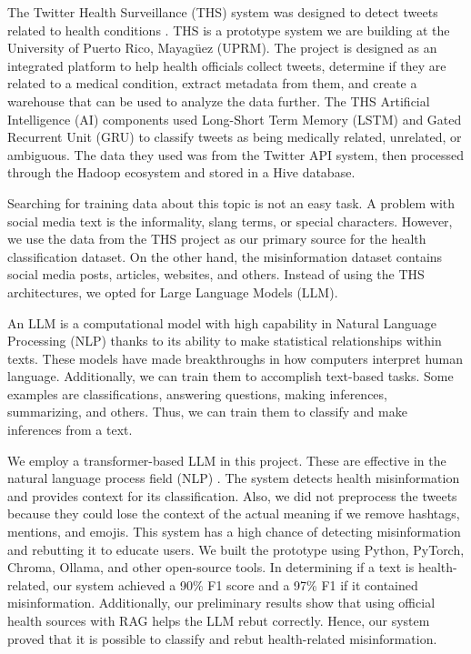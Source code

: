 The Twitter Health Surveillance (THS) system was designed to detect tweets related to health conditions \cite{8622504}. THS is a prototype system we are building at the University
of Puerto Rico, Mayag\"uez (UPRM). The project is designed as an integrated platform to help health officials collect tweets, determine if they are related to a medical condition, extract
metadata from them, and create a warehouse that can be used to analyze the data further. The THS Artificial Intelligence (AI) components used Long-Short Term Memory (LSTM)
and Gated Recurrent Unit (GRU) to classify tweets as being medically related, unrelated, or ambiguous. The data they used was from the Twitter API system, then processed
through the Hadoop ecosystem and stored in a Hive database.

Searching for training data about this topic is not an easy task. A problem with social media text is the informality, slang terms, or special characters. However, we use the
data from the THS project as our primary source for the health classification dataset. On the other hand, the misinformation dataset contains social media posts, articles,
websites, and others. Instead of using the THS architectures, we opted for Large Language Models (LLM). 

An LLM is a computational model with high capability in Natural Language Processing (NLP) thanks to its ability to make statistical relationships within texts. These models
have made breakthroughs in how computers interpret human language. Additionally, we can train them to accomplish text-based tasks. Some examples are classifications,
answering questions, making inferences, summarizing, and others. Thus, we can train them to classify and make inferences from a text.

We employ a transformer-based LLM in this project. These are effective in the natural language process field (NLP) \cite{DBLP:journals/corr/abs-2105-00813}.
The system detects health misinformation and provides context for its classification. Also, we did not preprocess the tweets because they could lose the context of the actual meaning if we
remove hashtags, mentions, and emojis. This system has a high chance of detecting misinformation and rebutting it to educate users. We built the prototype using Python, PyTorch, Chroma,
Ollama, and other open-source tools. In determining if a text is health-related, our system achieved a 90\% F1 score and a 97\% F1 if it contained misinformation. Additionally, our preliminary
results show that using official health sources with RAG helps the LLM rebut correctly. Hence, our system proved that it is possible to classify and rebut health-related misinformation.

